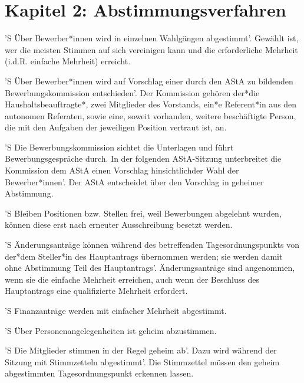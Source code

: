 \documentclass[fontsize=12pt,parskip=half, ref=short]{scrartcl}
\begin{document}
\section*{Kapitel 2: Abstimmungsverfahren}
\begin{contract}

  \label{Par:Wahlv}
  'S Über Bewerber*innen wird in einzelnen Wahlgängen abgestimmt'. Gewählt ist,
  wer die meisten Stimmen auf sich vereinigen kann und die erforderliche
  Mehrheit (i.d.R. einfache Mehrheit) erreicht.

  'S Über Bewerber*innen wird auf Vorschlag einer durch den AStA zu bildenden
  Bewerbungskommission entschieden'. Der Kommission gehören der*die
  Haushaltsbeauftragte*, zwei Mitglieder des Vorstands, ein*e Referent*in aus
  den autonomen Referaten, sowie eine, soweit vorhanden, weitere beschäftigte
  Person, die mit den Aufgaben der jeweiligen Position vertraut ist, an.

  'S Die Bewerbungskommission sichtet die Unterlagen und führt
  Bewerbungsgespräche durch. In der folgenden AStA-Sitzung unterbreitet die
  Kommission dem AStA einen Vorschlag hinsichtlichder Wahl der Bewerber*innen'.
  Der AStA entscheidet über den Vorschlag in geheimer Abstimmung.

  'S Bleiben Positionen bzw. Stellen frei, weil Bewerbungen abgelehnt wurden,
  können diese erst nach erneuter Ausschreibung besetzt werden.

  \label{Par:Abstimmver}
  'S Änderungsanträge können während des betreffenden Tagesordnungspunkts von
  der*dem Steller*in des Hauptantrags übernommen werden; sie werden damit ohne
  Abstimmung Teil des Hauptantrags'. Änderungsanträge sind angenommen, wenn sie
  die einfache Mehrheit erreichen, auch wenn der Beschluss des Hauptantrags eine
  qualifizierte Mehrheit erfordert.

  'S Finanzanträge werden mit einfacher Mehrheit abgestimmt.

  'S Über Personenangelegenheiten ist geheim abzustimmen.

  'S Die Mitglieder stimmen in der Regel geheim ab'. Dazu wird während der
  Sitzung mit Stimmzetteln abgestimmt'. Die Stimmzettel müssen den geheim
  abgestimmten Tagesordnungspunkt erkennen lassen.
\end{contract}
\end{document}
